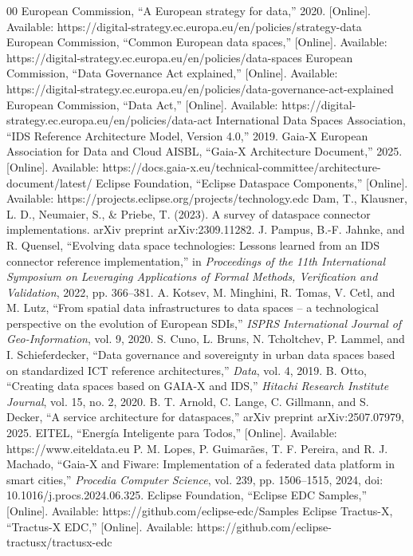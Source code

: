 \documentclass[a4paper,fleqn]{cas-dc}
\begin{document}
\begin{thebibliography}{00}
 European Commission, ``A European strategy for data,'' 2020. [Online]. Available: https://digital-strategy.ec.europa.eu/en/policies/strategy-data
 European Commission, ``Common European data spaces,'' [Online]. Available: https://digital-strategy.ec.europa.eu/en/policies/data-spaces
 European Commission, ``Data Governance Act explained,'' [Online]. Available: https://digital-strategy.ec.europa.eu/en/policies/data-governance-act-explained
 European Commission, ``Data Act,'' [Online]. Available: https://digital-strategy.ec.europa.eu/en/policies/data-act
 International Data Spaces Association, ``IDS Reference Architecture Model, Version 4.0,'' 2019.
 Gaia-X European Association for Data and Cloud AISBL, ``Gaia-X Architecture Document,'' 2025. [Online]. Available: https://docs.gaia-x.eu/technical-committee/architecture-document/latest/
 Eclipse Foundation, ``Eclipse Dataspace Components,'' [Online]. Available: https://projects.eclipse.org/projects/technology.edc
 Dam, T., Klausner, L. D., Neumaier, S., & Priebe, T. (2023). A survey of dataspace connector implementations. arXiv preprint arXiv:2309.11282.
 J. Pampus, B.-F. Jahnke, and R. Quensel, ``Evolving data space technologies: Lessons learned from an IDS connector reference implementation,'' in \textit{Proceedings of the 11th International Symposium on Leveraging Applications of Formal Methods, Verification and Validation}, 2022, pp. 366--381.
 A. Kotsev, M. Minghini, R. Tomas, V. Cetl, and M. Lutz, ``From spatial data infrastructures to data spaces -- a technological perspective on the evolution of European SDIs,'' \textit{ISPRS International Journal of Geo-Information}, vol. 9, 2020.
 S. Cuno, L. Bruns, N. Tcholtchev, P. Lammel, and I. Schieferdecker, ``Data governance and sovereignty in urban data spaces based on standardized ICT reference architectures,'' \textit{Data}, vol. 4, 2019.
 B. Otto, ``Creating data spaces based on GAIA-X and IDS,'' \textit{Hitachi Research Institute Journal}, vol. 15, no. 2, 2020.
 B. T. Arnold, C. Lange, C. Gillmann, and S. Decker, ``A service architecture for dataspaces,'' arXiv preprint arXiv:2507.07979, 2025.
 EITEL, ``Energía Inteligente para Todos,'' [Online]. Available: https://www.eiteldata.eu
 P. M. Lopes, P. Guimarães, T. F. Pereira, and R. J. Machado, ``Gaia-X and Fiware: Implementation of a federated data platform in smart cities,'' \textit{Procedia Computer Science}, vol. 239, pp. 1506--1515, 2024, doi: 10.1016/j.procs.2024.06.325.
 Eclipse Foundation, ``Eclipse EDC Samples,'' [Online]. Available: https://github.com/eclipse-edc/Samples
 Eclipse Tractus-X, ``Tractus-X EDC,'' [Online]. Available: https://github.com/eclipse-tractusx/tractusx-edc
\end{thebibliography}
\end{document}
